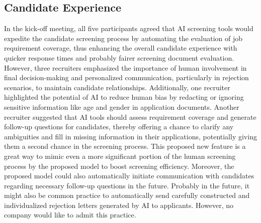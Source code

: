 \documentclass[draft,final]{thesisclass} %
\begin{document}
\subsection{Candidate Experience}
In the kick-off meeting, all five participants agreed that \acs{AI} screening tools would expedite the candidate screening process by automating the evaluation of job requirement coverage, thus enhancing the overall candidate experience with quicker response times and probably fairer screening document evaluation. However, three recruiters emphasized the importance of human involvement in final decision-making and personalized communication, particularly in rejection scenarios, to maintain candidate relationships. Additionally, one recruiter highlighted the potential of \acs{AI} to reduce human bias by redacting or ignoring sensitive information like age and gender in application documents. Another recruiter suggested that \acs{AI} tools should assess requirement coverage and generate follow-up questions for candidates, thereby offering a chance to clarify any ambiguities and fill in missing information in their applications, potentially giving them a second chance in the screening process. This proposed new feature is a great way to mimic even a more significant portion of the human screening process by the proposed model to boost screening efficiency. 
Moreover, the proposed model could also automatically initiate communication with candidates regarding necessary follow-up questions in the future. Probably in the future, it might also be common practice to automatically send carefully constructed and individualized rejection letters generated by \acs{AI} to applicants. However, no company would like to admit this practice.
\end{document}
